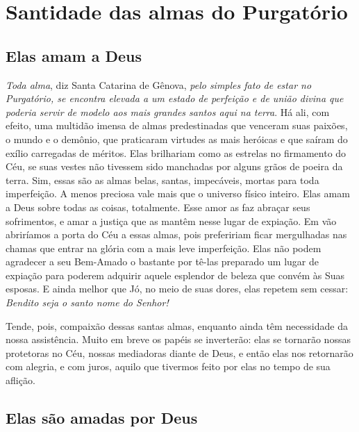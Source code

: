 \renewcommand{\thechapterdisplay}{Décimo primeiro dia}
\renewcommand{\thechapterrunner}{Santidade das almas do Purgatório}
\chapter[Décimo primeiro dia --- Santidade das almas do Purgatório]{Santidade das almas do Purgatório}
\section*{Elas amam a Deus}

\textit{Toda alma}, diz Santa Catarina de Gênova, \textit{pelo simples fato de estar no Purgatório, se encontra elevada a um estado de perfeição e de união divina que poderia servir de modelo aos mais grandes santos aqui na terra}. Há ali, com efeito, uma multidão imensa de almas predestinadas que venceram suas paixões, o mundo e o demônio, que praticaram virtudes as mais heróicas e que saíram do exílio carregadas de méritos. Elas brilhariam como as estrelas no firmamento do Céu, se suas vestes não tivessem sido manchadas por alguns grãos de poeira da terra. Sim, essas são as almas belas, santas, impecáveis, mortas para toda imperfeição. A menos preciosa vale mais que o universo físico inteiro. Elas amam a Deus sobre todas as coisas, totalmente. Esse amor as faz abraçar seus sofrimentos, e amar a justiça que as mantêm nesse lugar de expiação. Em vão abriríamos a porta do Céu a essas almas, pois prefeririam ficar mergulhadas nas chamas que entrar na glória com a mais leve imperfeição. Elas não podem agradecer a seu Bem-Amado o bastante por tê-las preparado um lugar de expiação para poderem adquirir aquele esplendor de beleza que convém às Suas esposas. E ainda melhor que Jó, no meio de suas dores, elas repetem sem cessar: \textit{Bendito seja o santo nome do Senhor!}

Tende, pois, compaixão dessas santas almas, enquanto ainda têm necessidade da nossa assistência. Muito em breve os papéis se inverterão: elas se tornarão nossas protetoras no Céu, nossas mediadoras diante de Deus, e então elas nos retornarão com alegria, e com juros, aquilo que tivermos feito por elas no tempo de sua aflição. 


\section*{Elas são amadas por Deus}

